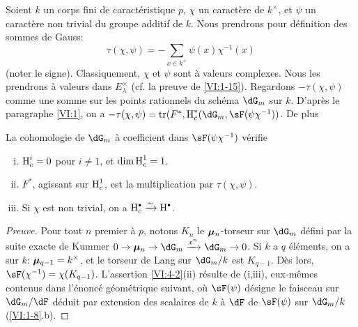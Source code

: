 Soient $k$ un corps fini de caract\'eristique $p$, $\chi$ un caract\`ere de 
$k^\times$, et $\psi$ un caract\`ere non trivial du groupe additif de $k$. Nous 
prendrons pour d\'efinition des sommes de Gauss: 
\begin{equation*}\tag{4.1.1}\label{VI:eq:4-1-1}
  \tau(\chi,\psi) = -\sum_{x\in k^\times} \psi(x) \chi^{-1}(x) 
\end{equation*}
(noter le signe). Classiquement, $\chi$ et $\psi$ sont \`a valeurs complexes. 
Nous les prendrons \`a valeurs dans $E_\lambda^\times$ (cf. la preuve de 
\ref{VI:1-15}). Regardons $-\tau(\chi,\psi)$ comme une somme sur les points 
rationnels du sch\'ema $\dG_m$ sur $k$. D'apr\`es le paragraphe \ref{VI:1}, 
on a $-\tau(\chi,\psi) = \tr(F^\ast,\h_c^\ast(\dG_m,\sF(\psi \chi^{-1}))$. De 
plus 





\begin{proposition_}\label{VI:4-2}
La cohomologie de $\dG_m$ \`a coefficient dans $\sF(\psi\chi^{-1})$ v\'erifie 
\begin{enumerate}[(i)]
  \item $\operatorname{H}_c^i=0$ pour $i\ne 1$, et $\dim \operatorname{H}_c^1=1$. 
  \item $F^\ast$, agissant sur $\operatorname{H}_c^1$, est la multiplication par 
    $\tau(\chi,\psi)$. 
  \item Si $\chi$ est non trivial, on a $\h_c^\bullet \iso \h^\bullet$. 
\end{enumerate}
\end{proposition_}
\begin{proof}[Preuve]
Pour tout $n$ premier \`a $p$, notons $K_n$ le ${\bm\mu}_n$-torseur sur $\dG_m$ 
d\'efini par la suite exacte de Kummer 
$0 \to \dmu_n \to \dG_m \xrightarrow{x^n} \dG_m \to 0$. Si $k$ a $q$ 
\'el\'ements, on a sur $k$: ${\bm\mu}_{q-1}=k^\times$, et le torseur de Lang sur 
$\dG_m/k$ est $K_{q-1}$. D\`es lors, $\sF(\chi^{-1})=\chi(K_{q-1})$. 
L'assertion \ref{VI:4-2}(ii) r\'esulte de (i,iii), eux-m\^emes contenus dans 
l'\'enonc\'e g\'eom\'etrique suivant, o\`u $\sF(\psi)$ d\'esigne le faisceau 
sur $\dG_m/\dF$ d\'eduit par extension des scalaires de $k$ \`a $\dF$ de 
$\sF(\psi)$ sur $\dG_m/k$ (\ref{VI:1-8}.b). 
\end{proof}





